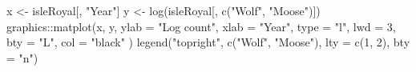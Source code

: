 \begin{Schunk}
\begin{Sinput}
 x <- isleRoyal[, "Year"]
 y <- log(isleRoyal[, c("Wolf", "Moose")])
 graphics::matplot(x, y,
   ylab = "Log count", xlab = "Year", type = "l",
   lwd = 3, bty = "L", col = "black"
 )
 legend("topright", c("Wolf", "Moose"), lty = c(1, 2), bty = "n")
\end{Sinput}
\end{Schunk}
